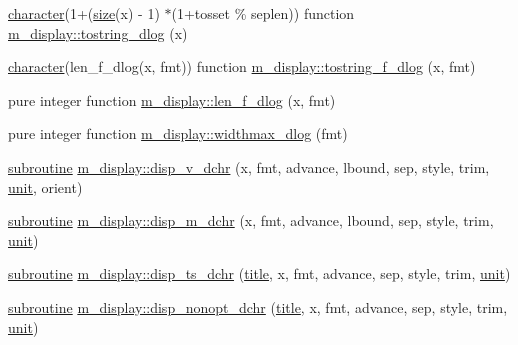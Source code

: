 \begin{DoxyCompactItemize}
\item 
\hyperlink{option__stopwatch_83_8txt_abd4b21fbbd175834027b5224bfe97e66}{character}(1+(\hyperlink{what__overview_81_8txt_ab5692ed87074f1d5ec850a9ffa8b5af9}{size}(x) -\/ 1) $\ast$(1+tosset \% seplen)) function \hyperlink{namespacem__display_ac4b7da9242ea26fd744e1301444d374a}{m\+\_\+display\+::tostring\+\_\+dlog} (x)
\item 
\hyperlink{option__stopwatch_83_8txt_abd4b21fbbd175834027b5224bfe97e66}{character}(len\+\_\+f\+\_\+dlog(x, fmt)) function \hyperlink{namespacem__display_aa23f6d3ab75d3383a0e95a4582cedc87}{m\+\_\+display\+::tostring\+\_\+f\+\_\+dlog} (x, fmt)
\item 
pure integer function \hyperlink{namespacem__display_a2a298a8f2faf00047152b93cd265d396}{m\+\_\+display\+::len\+\_\+f\+\_\+dlog} (x, fmt)
\item 
pure integer function \hyperlink{namespacem__display_ac342ada170e8066fa938cf8eb69f09bb}{m\+\_\+display\+::widthmax\+\_\+dlog} (fmt)
\item 
\hyperlink{M__stopwatch_83_8txt_acfbcff50169d691ff02d4a123ed70482}{subroutine} \hyperlink{namespacem__display_a9be0f6a0bd57a08e389fe742311b7a02}{m\+\_\+display\+::disp\+\_\+v\+\_\+dchr} (x, fmt, advance, lbound, sep, style, trim, \hyperlink{M__stopwatch_83_8txt_a5cbef30eb7c0d734bd82f5a7ebea9aa7}{unit}, orient)
\item 
\hyperlink{M__stopwatch_83_8txt_acfbcff50169d691ff02d4a123ed70482}{subroutine} \hyperlink{namespacem__display_aa72655968e5accf7c77477693c9f1bfa}{m\+\_\+display\+::disp\+\_\+m\+\_\+dchr} (x, fmt, advance, lbound, sep, style, trim, \hyperlink{M__stopwatch_83_8txt_a5cbef30eb7c0d734bd82f5a7ebea9aa7}{unit})
\item 
\hyperlink{M__stopwatch_83_8txt_acfbcff50169d691ff02d4a123ed70482}{subroutine} \hyperlink{namespacem__display_a337ce942da78737d24272e0c0cf55fbb}{m\+\_\+display\+::disp\+\_\+ts\+\_\+dchr} (\hyperlink{print__watch_83_8txt_a15b5bd21156bb9fca6a755ab8c029a9c}{title}, x, fmt, advance, sep, style, trim, \hyperlink{M__stopwatch_83_8txt_a5cbef30eb7c0d734bd82f5a7ebea9aa7}{unit})
\item 
\hyperlink{M__stopwatch_83_8txt_acfbcff50169d691ff02d4a123ed70482}{subroutine} \hyperlink{namespacem__display_a12b5831082d636bdab23dbc7c1ddb879}{m\+\_\+display\+::disp\+\_\+nonopt\+\_\+dchr} (\hyperlink{print__watch_83_8txt_a15b5bd21156bb9fca6a755ab8c029a9c}{title}, x, fmt, advance, sep, style, trim, \hyperlink{M__stopwatch_83_8txt_a5cbef30eb7c0d734bd82f5a7ebea9aa7}{unit})
\item 

\end{DoxyCompactItemize}
